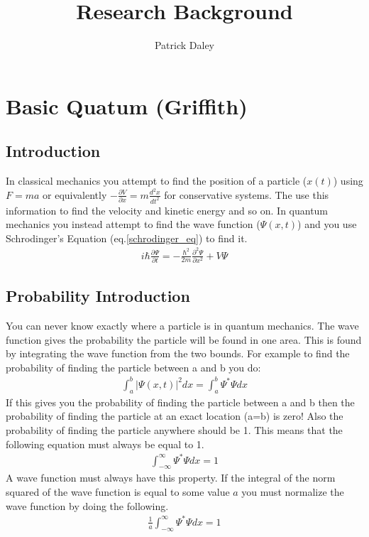 \documentclass{article}
\title{Research Background}
\author{Patrick Daley}
\begin{document}
\maketitle

\def\exp#1{\left<#1\right>}

\section{Basic Quatum (Griffith)}

\subsection{Introduction}
In classical mechanics you attempt to find the position of a particle ($x(t)$) using $F=ma$ or equivalently $-\frac{\partial V}{\partial x} = m \frac{d^2x}{dt^2}$ for conservative systems. The use this information to find the velocity and kinetic energy and so on. In quantum mechanics you instead attempt to find the wave function ($\Psi(x,t)$) and you use Schrodinger's Equation (eq.\ref{schrodinger_eq}) to find it. 
\begin{align} \label{schrodinger_eq}
i\hbar \frac{\partial \Psi}{\partial t} = - \frac{\hbar^2}{2m}\frac{\partial^2 \Psi}{\partial x^2} + V\Psi
\end{align}
\subsection{Probability Introduction}
You can never know exactly where a particle is in quantum mechanics. The wave function gives the probability  the particle will be found in one area. This is found by integrating the wave function from the two bounds. For example to find the probability of finding the particle between a and b you do:
\begin{align}
\int_a^b |\Psi(x,t)|^2 dx = \int_a^b \Psi^*\Psi dx
\end{align}
If this gives you the probability of finding the particle between a and b then the probability of finding the particle at an exact location (a=b) is zero! Also the probability of finding the particle anywhere should be 1. This means that the following equation must always be equal to 1.
\begin{align}
\int_{-\infty}^{\infty} \Psi^*\Psi dx = 1
\end {align}
A wave function must always have this property. If the integral of the norm squared of the wave function is equal to some value $a$ you must normalize the wave function by doing the following.
\begin{align*}
\frac{1}{a}\int_{-\infty}^{\infty} \Psi^*\Psi dx = 1
\end{align*}
\end{document}
